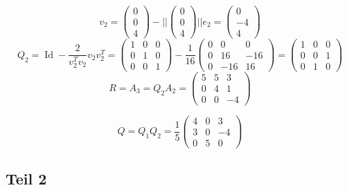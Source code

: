 \documentclass[10pt,a4paper]{article}
\DeclareMathOperator{\id}{Id}
\begin{document}
\begin{equation}
  v_{2} = \begin{pmatrix}
    0\\0\\4
  \end{pmatrix}
  - ||\begin{pmatrix}
    0\\0\\4
  \end{pmatrix}|| e_{2}
  =
  \begin{pmatrix}
    0\\-4\\4
  \end{pmatrix}
\end{equation}
\begin{equation}
  Q_{2} = \id - \frac{2}{v_{2}^{T}v_{2}}v_{2}v_{2}^{T} =
  \begin{pmatrix}
    1 & 0 & 0\\
    0 & 1 & 0\\
    0 & 0 & 1
  \end{pmatrix}
  - \frac{1}{16}
  \begin{pmatrix}
    0 & 0 & 0\\
    0 & 16 & -16\\
    0 & -16 & 16
  \end{pmatrix}
  = \begin{pmatrix}
    1 & 0 & 0\\
    0 & 0 & 1\\
    0 & 1 & 0
  \end{pmatrix}
\end{equation}
\begin{equation}
  R = A_{3} = Q_{2}A_{2} = \begin{pmatrix}
    5 & 5 & 3\\
    0 & 4 & 1\\
    0 & 0 & -4
  \end{pmatrix}
\end{equation}

\begin{equation}
  Q = Q_{1}Q_{2} = \frac{1}{5}\begin{pmatrix}
    4 & 0 & 3\\
    3 & 0 & -4\\
    0 & 5 & 0
  \end{pmatrix}
\end{equation}

\subsection{Teil 2}
\end{document}
